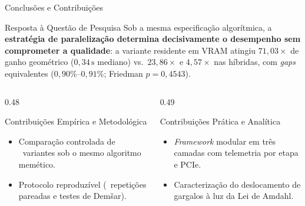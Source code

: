 \begin{frame}{Conclusões e Contribuições}
  \begin{exampleblock}{Resposta à Questão de Pesquisa}
    Sob a mesma especificação algorítmica, a \textbf{estratégia de paralelização determina decisivamente o desempenho sem comprometer a qualidade}: a variante residente em VRAM atingiu \textbf{$71{,}03\times$} de ganho geométrico ($0{,}34\,\text{s}$ mediano) vs.\ $23{,}86\times$ e $4{,}57\times$ nas híbridas, com \emph{gaps} equivalentes ($0{,}90\%\text{--}0{,}91\%$; Friedman $p = 0{,}4543$).
  \end{exampleblock}

  \vspace{0.12cm}
  \begin{columns}[T,onlytextwidth]
    \begin{column}{0.48\textwidth}
      \begin{block}{Contribuições Empírica e Metodológica}
        \begin{itemize}
          \item Comparação controlada de \totalvariantes\ variantes sob o mesmo algoritmo memético.
          \item Protocolo reproduzível (\totalrepeticoes\ repetições pareadas e testes de Demšar).
        \end{itemize}
      \end{block}
    \end{column}
    \begin{column}{0.49\textwidth}
      \begin{block}{Contribuições Prática e Analítica}
        \begin{itemize}
          \item \emph{Framework} modular em três camadas com telemetria por etapa e PCIe.
          \item Caracterização do deslocamento de gargalos à luz da Lei de Amdahl.
        \end{itemize}
      \end{block}
    \end{column}
  \end{columns}
\end{frame}

